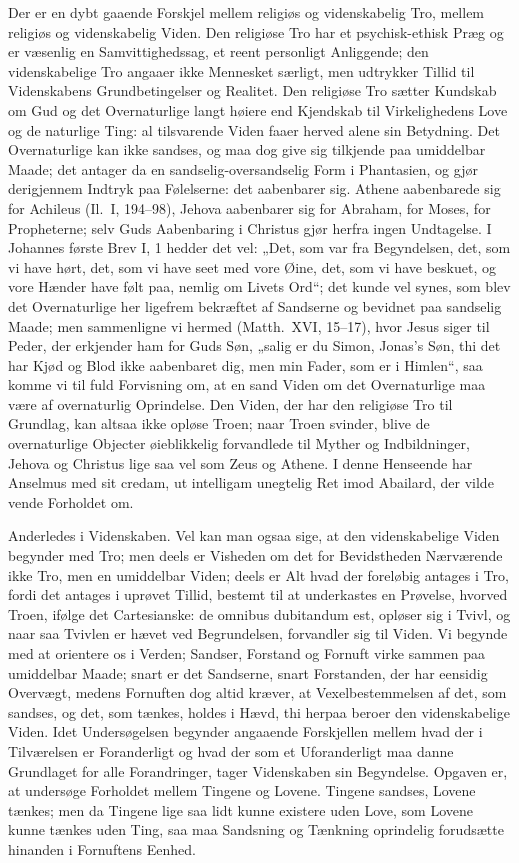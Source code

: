 \documentclass[12pt,a4paper]{article}
\newcommand{\opage}[1]{\marginnote{\footnotesize\textit{[#1]}}}
\begin{document}
Der er en dybt gaaende Forskjel mellem religiøs og videnskabelig Tro,
mellem religiøs og videnskabelig Viden. Den religiøse Tro har et
psychisk-ethisk Præg og er væsenlig en Samvittighedssag, et reent
personligt Anliggende; den videnskabelige Tro angaaer ikke Mennesket
særligt, men udtrykker Tillid til Videnskabens Grundbetingelser og
Realitet. Den religiøse Tro sætter Kundskab om Gud og det Overnaturlige
langt høiere end Kjendskab til Virkelighedens Love og de naturlige
Ting: al tilsvarende Viden faaer herved alene sin Betydning. Det
Overnaturlige kan ikke sandses, og maa dog give sig tilkjende paa
umiddelbar Maade; det antager da en sandselig-oversandselig Form i
Phantasien, og gjør derigjennem Indtryk paa Følelserne: det aabenbarer
sig. Athene aabenbarede sig for Achileus (Il.\ I, 194--98), Jehova
aabenbarer sig for Abraham, for Moses, for Propheterne; selv Guds
Aabenbaring i Christus gjør herfra ingen Undtagelse. I Johannes første
Brev I, 1 hedder det vel: „Det, som var fra Begyndelsen, det, som vi
have hørt, det, som vi have seet med vore Øine, det, som vi have
beskuet, og vore Hænder have følt paa, nemlig om Livets Ord“; det
kunde vel synes, som blev det Overnaturlige her ligefrem bekræftet af
Sandserne og bevidnet paa sandselig Maade; men sammenligne vi hermed
(Matth.\ XVI, 15--17), hvor Jesus siger til Peder, der erkjender ham
for Guds Søn, „salig er du Simon, Jonas's Søn, thi det har Kjød og
Blod ikke aabenbaret dig, men min Fader, som er i Himlen“, saa komme
vi til fuld Forvisning om, at en sand Viden om det Overnaturlige maa
være af overnaturlig Oprindelse. Den Viden, der har den religiøse Tro
til Grundlag, kan altsaa ikke opløse Troen; naar Troen svinder, blive
de overnaturlige Objecter øieblikkelig forvandlede til Myther og
Indbildninger, Jehova og Christus lige saa vel som Zeus og Athene. I
denne Henseende har Anselmus med sit credam, ut intelligam %
unegtelig Ret imod Abailard, der vilde vende Forholdet om.

\opage{6} Anderledes i Videnskaben. Vel kan man ogsaa sige, at den videnskabelige
Viden begynder med Tro; men deels er Visheden om det for Bevidstheden
Nærværende ikke Tro, men en umiddelbar Viden; deels er Alt hvad der
foreløbig antages i Tro, fordi det antages i uprøvet Tillid, bestemt
til at underkastes en Prøvelse, hvorved Troen, ifølge det Cartesianske:
de omnibus dubitandum est, opløser sig i Tvivl, og naar saa
Tvivlen er hævet ved Begrundelsen, forvandler sig til Viden. Vi begynde
med at orientere os i Verden; Sandser, Forstand og Fornuft virke
sammen paa umiddelbar Maade; snart er det Sandserne, snart Forstanden,
der har eensidig Overvægt, medens Fornuften dog altid kræver, at
Vexelbestemmelsen af det, som sandses, og det, som tænkes, holdes i
Hævd, thi herpaa beroer den videnskabelige Viden. Idet Undersøgelsen
begynder angaaende Forskjellen mellem hvad der i Tilværelsen er
Foranderligt og hvad der som et Uforanderligt maa danne Grundlaget for
alle Forandringer, tager Videnskaben sin Begyndelse. Opgaven er, at
undersøge Forholdet mellem Tingene og Lovene. Tingene sandses, Lovene
tænkes; men da Tingene lige saa lidt kunne existere uden Love, som
Lovene kunne tænkes uden Ting, saa maa Sandsning og Tænkning oprindelig
forudsætte hinanden i Fornuftens Eenhed.
\end{document}
